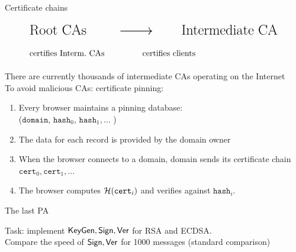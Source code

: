 \documentclass[usenames,dvipsnames, 9pt]{beamer}
\begin{document}
\begin{frame}{Certificate chains}
	\Large
	\begin{center}
	
	\begin{align*}
			&{\LARGE \text{Root CAs } \quad \quad\xrightarrow{\hspace{2em}} \quad \quad \text{Intermediate CA}} \\
			&\text{certifies Interm.\ CAs}  \hspace{46pt} \text{certifies clients} 
	\end{align*}
	\end{center}
	\vspace{20pt}
	There are currently thousands of intermediate CAs operating on the Internet \\[10pt]
	To avoid malicious CAs: {\color{Orange} certificate pinning:} \\[7pt]
	\begin{enumerate}
		\item Every browser maintains a pinning database: \\
		($\texttt{domain}$, $\texttt{hash}_0$, $\texttt{hash}_1, \ldots$ )
		\item The data for each record is provided by the domain owner
		\item 	When the browser connects to a domain, domain sends its certificate chain $\texttt{cert}_0, 
		\texttt{cert}_1, \ldots$
		\item The browser computes $\mathcal{H}(\texttt{cert}_i)$ and verifies against $\texttt{hash}_i$. 
	\end{enumerate}
	
\end{frame}

\begin{frame}{The last PA}

	\Large
	Task: implement $\textsf{KeyGen}, \textsf{Sign}, \textsf{Ver}$ for RSA and ECDSA. \\[10pt]
	Compare the speed of $\textsf{Sign}, \textsf{Ver}$ for 1000 messages (standard comparison)
\end{frame}
\end{document}
